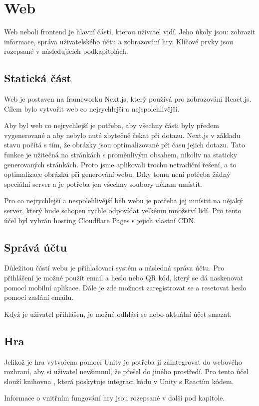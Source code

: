 \section{Web}
Web neboli frontend je hlavní částí, kterou uživatel vidí. Jeho úkoly jsou: zobrazit informace, správa uživatelského účtu a zobrazování hry. Klíčové prvky jsou rozepsané v následujících podkapitolách.

\subsection{Statická část}
Web je postaven na frameworku Next.js, který používá pro zobrazování React.js. Cílem bylo vytvořit web co nejrychlejší a nejspolehlivější.\par
Aby byl web co nejrychlejší je potřeba, aby všechny části byly předem vygenerované a aby nebylo nuté zbytečně čekat při dotazu. Next.js v základu stavu počítá s tím, že obrázky jsou optimalizované při času jejich dotazu. Tato funkce je užitečná na stránkách s proměnlivým obsahem, nikoliv na staticky generovaných stránkách. Proto jsme aplikovali trochu netradiční řešení, a to optimalizace obrázků při generování webu. Díky tomu není potřeba žádný speciální server a je potřeba jen všechny soubory někam umístit.\par
Pro co nejrychlejší a nespolehlivější běh webu je potřeba jej umístit na nějaký server, který bude schopen rychle odpovídat velkému množství lidí. Pro tento účel byl vybrán hosting Cloudflare Pages\cite{Cloudflare-pages} s jejich vlastní CDN\cite{Cloudflare-cdn}. 

\subsection{Správá účtu}
Důležitou částí webu je přihlašovací systém a následná správa účtu. Pro přihlášení je možné použít email a heslo nebo QR kód, který se dá naskenovat pomocí mobilní aplikace. Dále je zde možnost zaregistrovat se a resetovat heslo pomocí zaslání emailu.\par
Když je uživatel přihlášen, je možné odhlási se nebo aktuální účet smazat.

\subsection{Hra}
Jelikož je hra vytvořena pomocí Unity je potřeba ji zaintegrovat do webového rozhraní, aby si uživatel nevšimnul, že přešel do jiného prostředí. Pro tento účel slouží knihovna \cite{react-unity-webgl}, která poskytuje integraci kódu v Unity s Reactím kódem.\par
Informace o vnitřním fungování hry jsou rozepsané v další pod kapitole.
